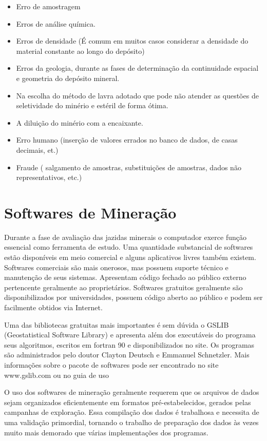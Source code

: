 \begin{itemize}
\item Erro de amostragem 
\item Erros de análise química.
\item Erros de densidade (É comum em muitos casos considerar a densidade do material constante ao longo do depósito)
\item Erros da geologia, durante as fases de determinação da continuidade espacial e geometria do depósito mineral.
\item Na escolha do método de lavra adotado que pode não atender as questões de seletividade do minério e estéril de forma ótima.
\item A diluição do minério com a encaixante.
\item Erro humano (inserção de valores errados no banco de dados, de casas decimais, et.)
\item Fraude ( salgamento de amostras, substituições de amostras, dados não representativos, etc.)

\end{itemize}

\section{Softwares de Mineração}

Durante a fase de avaliação das jazidas minerais o computador exerce função essencial como ferramenta de estudo. Uma quantidade substancial de softwares estão disponíveis em meio comercial e alguns aplicativos livres também existem. Softwares comerciais são mais onerosos, mas possuem suporte técnico e manutenção de seus sistemas. Apresentam código fechado ao público externo pertencente geralmente ao proprietários. Softwares gratuitos geralmente são disponibilizados por universidades, possuem código aberto ao público e podem ser facilmente obtidos via Internet.  

Uma das bibliotecas gratuitas mais importantes é sem dúvida o GSLIB (Geostatistical Software Library) e apresenta além dos executáveis do programa seus algoritmos, escritos em fortran 90 e disponibilizados no site. Os programas são administrados pelo doutor Clayton Deutsch e Emmanuel Schnetzler. Mais informações sobre o pacote de softwares pode ser encontrado no site www.gslib.com ou no guia de uso \cite{deutschcv1998gslib}

O uso dos softwares de mineração geralmente requerem que os arquivos de dados sejam organizados eficientemente em formatos pré-estabelecidos, gerados pelas campanhas de exploração.  Essa compilação dos dados é trabalhosa e necessita de uma validação primordial, tornando o trabalho de preparação dos dados às vezes muito mais demorado que várias implementações dos programas.  

